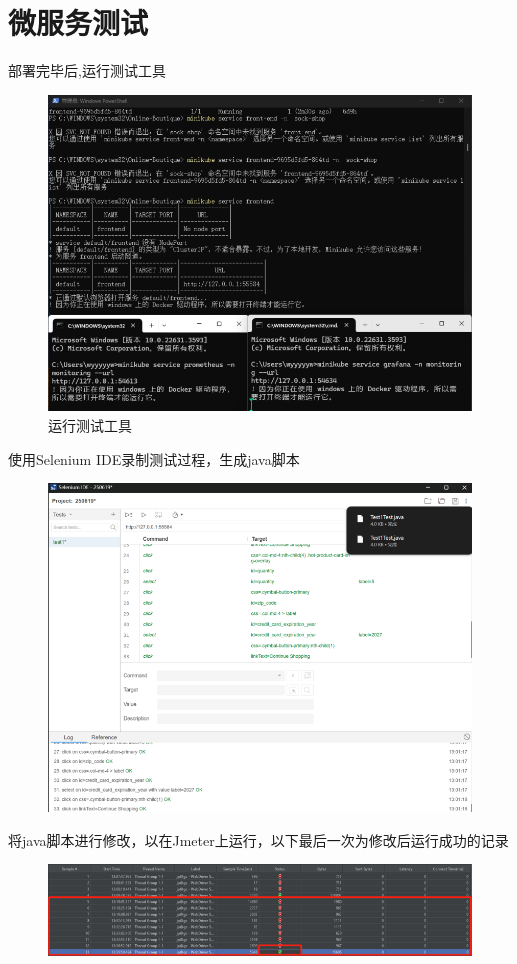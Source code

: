 \documentclass[hyperref,a4paper,UTF8]{ctexart}
\begin{document}
\section{微服务测试}
部署完毕后,运行测试工具
\begin{figure}[H]
    \centering
    \includegraphics[width=0.75\linewidth]{测试/1.png}
    \caption{运行测试工具}
    \label{fig:enter-label}
\end{figure}
使用Selenium IDE录制测试过程，生成java脚本
\begin{figure}[H]
    \centering
    \includegraphics[width=0.75\linewidth]{测试/2.png}
    \label{fig:enter-label}
\end{figure}
将java脚本进行修改，以在Jmeter上运行，以下最后一次为修改后运行成功的记录
\begin{figure}[H]
    \centering
    \includegraphics[width=0.75\linewidth]{测试/3.png}
    \label{fig:enter-label}
\end{figure}
\end{document}
